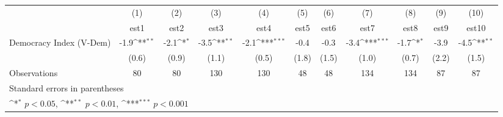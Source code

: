{
\def\sym#1{\ifmmode^{#1}\else\(^{#1}\)\fi}
\begin{tabular}{l*{10}{c}}
\hline\hline
                    &\multicolumn{1}{c}{(1)}         &\multicolumn{1}{c}{(2)}         &\multicolumn{1}{c}{(3)}         &\multicolumn{1}{c}{(4)}         &\multicolumn{1}{c}{(5)}         &\multicolumn{1}{c}{(6)}         &\multicolumn{1}{c}{(7)}         &\multicolumn{1}{c}{(8)}         &\multicolumn{1}{c}{(9)}         &\multicolumn{1}{c}{(10)}         \\
                    &        est1         &        est2         &        est3         &        est4         &        est5         &        est6         &        est7         &        est8         &        est9         &       est10         \\
\hline
Democracy Index (V-Dem)&        -1.9\sym{**} &        -2.1\sym{*}  &        -3.5\sym{**} &        -2.1\sym{***}&        -0.4         &        -0.3         &        -3.4\sym{***}&        -1.7\sym{*}  &        -3.9         &        -4.5\sym{**} \\
                    &       (0.6)         &       (0.9)         &       (1.1)         &       (0.5)         &       (1.8)         &       (1.5)         &       (1.0)         &       (0.7)         &       (2.2)         &       (1.5)         \\
\hline
Observations        &          80         &          80         &         130         &         130         &          48         &          48         &         134         &         134         &          87         &          87         \\
\hline\hline
\multicolumn{11}{l}{\footnotesize Standard errors in parentheses}\\
\multicolumn{11}{l}{\footnotesize \sym{*} \(p<0.05\), \sym{**} \(p<0.01\), \sym{***} \(p<0.001\)}\\
\end{tabular}
}
